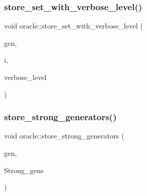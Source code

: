 \mbox{\label{classoracle_af83a814a952e0948650850c980072a15}} 
\subsubsection{\texorpdfstring{store\+\_\+set\+\_\+with\+\_\+verbose\+\_\+level()}{store\_set\_with\_verbose\_level()}}
{\footnotesize\ttfamily void oracle\+::store\+\_\+set\+\_\+with\+\_\+verbose\+\_\+level (\begin{DoxyParamCaption}\item[{\mbox{\hyperlink{classgenerator}{generator}} $\ast$}]{gen,  }\item[{\mbox{\hyperlink{galois_8h_a09fddde158a3a20bd2dcadb609de11dc}{I\+NT}}}]{i,  }\item[{\mbox{\hyperlink{galois_8h_a09fddde158a3a20bd2dcadb609de11dc}{I\+NT}}}]{verbose\+\_\+level }\end{DoxyParamCaption})}

\mbox{\label{classoracle_a905d0cad4b33515e581039ed8902b3be}} 
\subsubsection{\texorpdfstring{store\+\_\+strong\+\_\+generators()}{store\_strong\_generators()}}
{\footnotesize\ttfamily void oracle\+::store\+\_\+strong\+\_\+generators (\begin{DoxyParamCaption}\item[{\mbox{\hyperlink{classgenerator}{generator}} $\ast$}]{gen,  }\item[{\mbox{\hyperlink{classstrong__generators}{strong\+\_\+generators}} $\ast$}]{Strong\+\_\+gens }\end{DoxyParamCaption})}

\mbox{\label{classoracle_a57d236ce4ae82f8b34c318a558db1a59}} 
